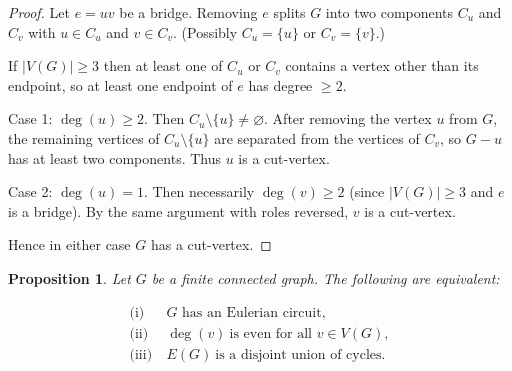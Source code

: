 \documentclass{article}
\theoremstyle{plain}
\newtheorem{proposition}{Proposition}
\theoremstyle{definition}
\theoremstyle{remark}
\begin{document}
\begin{proof}
Let $e=uv$ be a bridge. Removing $e$ splits $G$ into two components $C_u$ and $C_v$
with $u\in C_u$ and $v\in C_v$. (Possibly $C_u=\{u\}$ or $C_v=\{v\}$.)

If $|V(G)|\ge3$ then at least one of $C_u$ or $C_v$ contains a vertex other than
its endpoint, so at least one endpoint of $e$ has degree $\ge 2$. 

Case 1: $\deg(u)\ge2$. Then $C_u\setminus\{u\}\neq\varnothing$. After removing the
vertex $u$ from $G$, the remaining vertices of $C_u\setminus\{u\}$ are separated
from the vertices of $C_v$, so $G-u$ has at least two components. Thus $u$ is a
cut-vertex.

Case 2: $\deg(u)=1$. Then necessarily $\deg(v)\ge2$ (since $|V(G)|\ge3$ and $e$ is a bridge).
By the same argument with roles reversed, $v$ is a cut-vertex.

Hence in either case $G$ has a cut-vertex.
\end{proof}

\begin{proposition}
Let \(G\) be a finite connected graph. The following are equivalent:

\begin{align*}
\text{(i)}\ & G \text{ has an Eulerian circuit},\\
\text{(ii)}\ & \deg(v)\ \text{is even for all } v\in V(G),\\
\text{(iii)}\ & E(G)\ \text{is a disjoint union of cycles}.
\end{align*}
\end{proposition}
\end{document}
